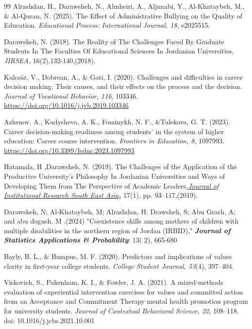 \documentclass[10pt]{NSP1}
\providecommand{\ul}[1]{\underline{#1}}
\begin{document}
\begin{thebibliography}{99}
 Alrashdan, H., Darawsheh, N., Almheiri, A., Aljanabi, Y., Al-Khataybeh, M., \& Al-Quran, N. (2025). The Effect of Administrative Bullying on the Quality of Education. \emph{Educational Process: International} \emph{Journal, 18}, e2025515.

 Darawsheh, N. (2018). The Reality of The Challenges Faced By Graduate Students In The Faculties Of Educational Sciences In Jordanian Universities, \emph{JIRSEA,} 16(2),132-140,(2018).

 Kulcsár, V., Dobrean, A., \& Gati, I. (2020). Challenges and difficulties in career decision making: Their causes, and their effects on the process and the decision. \emph{Journal of Vocational Behavior, 116}, 103346. \href{https://doi.org/10.1016/j.jvb.2019.103346}{\ul{https://doi.org/10.1016/j.jvb.2019.103346}}

 Azhenov, A., Kudysheva, A. K., Fominykh, N. F., \&Tulekova, G. T. (2023). Career decision-making readiness among students' in the system of higher education: Career course intervention. \emph{Frontiers in Education, 8}, 1097993. \href{https://doi.org/10.3389/feduc.2023.1097993}{\ul{https://doi.org/10.3389/feduc.2023.1097993}}

 Hatamala, H ,Darawsheh, N. (2019). The Challenges of the Application of the Productive University's Philosophy In Jordanian Universities and Ways of Developing Them from The Perspective of Academic Leaders,\emph{\href{https://www.scopus.com/authid/detail.uri?authorId=57205221009\#disabled}{Journal of Institutional Research South East Asia}\textbf{, }}17(1), pp. 93--117,(2019).

 Darawsheh, N; Al-Khataybeh, M; Alrashdan, H; Drawsheh, S; Abu Grarh, A; and abu dogush, M .(2024) "Coexistence skills among mothers of children with multiple disabilities in the northern region of Jordan (IRBID)," \emph{\textbf{Journal of}} \emph{\textbf{Statistics Applications \& Probability}}: 13( 2), 665-680

 Bayly, B. L., \& Bumpus, M. F. (2020). Predictors and implications of values clarity in first-year college students. \emph{College Student Journal, 53}(4), 397--404.

 Viskovich, S., Pakenham, K. I., \& Fowler, J. A. (2021). A mixed-methods evaluation of experiential intervention exercises for values and committed action from an Acceptance and Commitment Therapy mental health promotion program for university students. \emph{Journal of Contextual Behavioral Science, 22}, 108--118. doi: 10.1016/j.jcbs.2021.10.001


\end{thebibliography}
\end{document}

